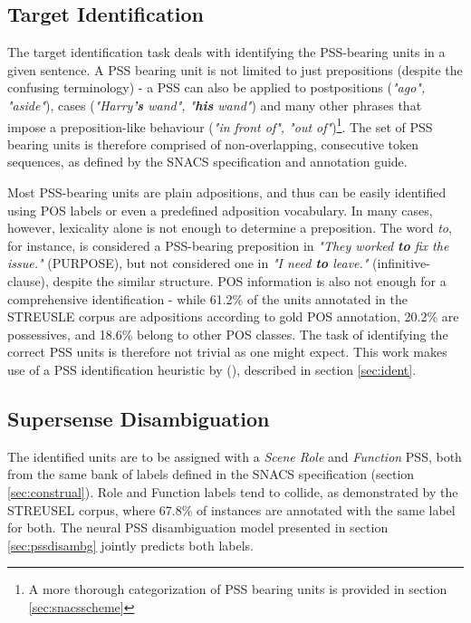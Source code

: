 \subsection{Target Identification}\label{sec:probform_ident}
The target identification task deals with identifying the PSS-bearing units in a given sentence. A PSS bearing unit is not limited to just prepositions (despite the confusing terminology) - a PSS can also be applied to postpositions (\emph{"ago", "aside"}), cases (\emph{"Harry\textbf{'s} wand", "\textbf{his} wand"}) and many other phrases that impose a preposition-like behaviour (\emph{"in front of", "out of"})\footnote{A more thorough categorization of PSS bearing units is provided in section \ref{sec:snacsscheme}}.  The set of PSS bearing units is therefore comprised of non-overlapping, consecutive token sequences, as defined by the SNACS specification and annotation guide. 

Most PSS-bearing units are plain adpositions, and thus can be easily identified using POS labels or even a predefined adposition vocabulary. In many cases, however, lexicality alone is not enough to determine a preposition. The word \emph{to}, for instance, is considered a PSS-bearing preposition in \emph{"They worked \textbf{to} fix the issue."} (PURPOSE), but not considered one in \emph{"I need \textbf{to} leave."} (infinitive-clause), despite the similar structure. POS information is also not enough for a comprehensive identification - while 61.2\% of the units annotated in the STREUSLE corpus are adpositions according to gold POS annotation, 20.2\% are possessives, and 18.6\% belong
to other POS classes. The task of identifying the correct PSS units is therefore not trivial as one might expect. This work makes use of a PSS identification heuristic by (\cite{snacs}), described in section \ref{sec:ident}.

\subsection{Supersense Disambiguation}\label{sec:probform_disam}

The identified units are to be assigned with a \emph{Scene Role} and \emph{Function} PSS, both from the same bank of labels defined in the SNACS specification (section \ref{sec:construal}). Role and Function labels tend to collide, as demonstrated by the STREUSEL corpus, where 67.8\% of instances are annotated with the same label for both. The neural PSS disambiguation model presented in section \ref{sec:pssdisambg} jointly predicts both labels.

